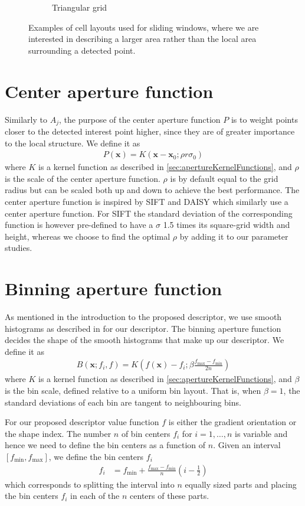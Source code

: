\documentclass[thesis.tex]{subfiles}
\def\x{\mathbf{x}}
\begin{document}
\begin{figure}[tb]
\begin{subfigure}[t]{0.45\textwidth}
		\caption{Triangular grid}
		\label{fig:gridTypeTriangle}
	\end{subfigure}
	\caption{Examples of cell layouts used for sliding windows, where we are interested in describing a larger area rather than the local area surrounding a detected point.}
\label{fig:gridTypeWindow}
\end{figure}
%
\section{Center aperture function}
\label{sec:centerApertureFunction}
%
Similarly to $A_j$, the purpose of the center aperture function $P$ is to weight points closer to the detected interest point higher, since they are of greater importance to the local structure. We define it as
%
\begin{align}
P(\x) = K(\x - \x_0; \rho r \sigma_0)
\end{align}
%
where $K$ is a kernel function as described in \ref{sec:apertureKernelFunctions}, and $\rho$ is the scale of the center aperture function. $\rho$ is by default equal to the grid radius but can be scaled both up and down to achieve the best performance. The center aperture function is inspired by SIFT \cite{lowe2004distinctive} and DAISY \cite{tola2008fast} which similarly use a center aperture function. For SIFT the standard deviation of the corresponding function is however pre-defined to have a $\sigma$ 1.5 times its square-grid width and height, whereas we choose to find the optimal $\rho$ by adding it to our parameter studies.
%
\section{Binning aperture function}
\label{sec:binningApertureFunction}
%
As mentioned in the introduction to the proposed descriptor, we use smooth histograms as described in  for our descriptor. The binning aperture function decides the shape of the smooth histograms that make up our descriptor. We define it as
\begin{align}
	B(\x; f_i, f) = K \left( f(\x) - f_i; \beta \frac{f_\text{max} - f_\text{min}}{2n} \right)
\end{align}
where $K$ is a kernel function as described in \ref{sec:apertureKernelFunctions}, and $\beta$ is the bin scale, defined relative to a uniform bin layout. That is, when $\beta = 1$, the standard deviations of each bin are tangent to neighbouring bins.

For our proposed descriptor value function $f$ is either the gradient orientation or the shape index. The number $n$ of bin centers $f_i$ for $i = 1,\hdots,n$ is variable and hence we need to define the bin centers as a function of $n$. Given an interval $[f_\text{min},f_\text{max}]$, we define the bin centers $f_i$
\begin{align}
	\label{eq:binCenters}
	f_i &= f_\text{min} + \frac{f_\text{max}-f_\text{min}}{n} \left(i - \frac{1}{2} \right)
\end{align}
which corresponds to splitting the interval into $n$ equally sized parts and placing the bin centers $f_i$ in each of the $n$ centers of these parts.
\end{document}
